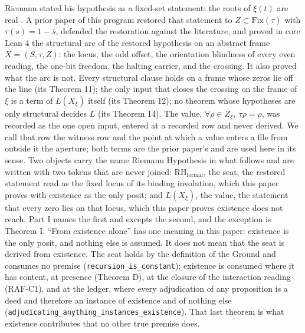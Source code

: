 \documentclass[10pt]{article}
\begin{document}
Riemann stated his hypothesis as a fixed-set statement: the roots of
\(\xi(t)\) are real \cite{riemann1859}. A prior paper of this program
\cite{islamspine} restored that statement to
\(Z \subset \mathrm{Fix}(\tau)\) with \(\tau(s) = 1 - \bar{s}\),
defended the restoration against the literature, and proved in core Lean
4 the structural arc of the restored hypothesis on an abstract frame
\(X = (S, \tau, Z)\): the locus, the odd offset, the orientation
blindness of every even reading, the one-bit freedom, the halting
carrier, and the crossing. It also proved what the arc is not. Every
structural clause holds on a frame whose zeros lie off the line (its
Theorem 11); the only input that closes the crossing on the frame of
\(\xi\) is a term of \(L(X_\xi)\) itself (its Theorem 12); no theorem
whose hypotheses are only structural decides \(L\) (its Theorem 14). The
value, \(\forall \rho \in Z_\xi,\ \tau\rho = \rho\), was recorded as the
one open input, entered at a recorded row and never derived. We call
that row the witness row and the point at which a value enters a file
from outside it the aperture; both terms are the prior paper's and are
used here in its sense. Two objects carry the name Riemann Hypothesis in
what follows and are written with two tokens that are never joined:
\(\mathrm{RH}_{\mathrm{formal}}\), the seat, the restored statement read
as the fixed locus of its binding involution, which this paper proves
with existence as the only posit; and \(L(X_\xi)\), the value, the
statement that every zero lies on that locus, which this paper proves
existence does not reach. Part I names the first and excepts the second,
and the exception is Theorem I. ``From existence alone'' has one meaning
in this paper: existence is the only posit, and nothing else is assumed.
It does not mean that the seat is derived from existence. The seat holds
by the definition of the Ground and consumes no premise
(\texttt{recursion\_\allowbreak is\_\allowbreak constant}); existence is
consumed where it has content, at presence (Theorem D), at the closure
of the interaction reading (RAF-C1), and at the ledger, where every
adjudication of any proposition is a deed and therefore an instance of
existence and of nothing else
(\texttt{adjudicating\_\allowbreak anything\_\allowbreak instances\_\allowbreak existence}).
That last theorem is what existence contributes that no other true
premise does.
\end{document}
